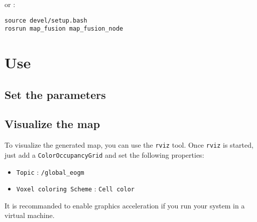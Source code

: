 or :

\begin{verbatim}
source devel/setup.bash
rosrun map_fusion map_fusion_node
\end{verbatim}

\section{Use}

\subsection{Set the parameters}

\todo

\subsection{Visualize the map}

To visualize the generated map, you can use the \texttt{rviz} tool. Once \texttt{rviz} is started, just add a \texttt{ColorOccupancyGrid} and set the following properties:

\begin{itemize}
    \item \texttt{Topic} : \texttt{/global\_eogm}
    \item \texttt{Voxel coloring Scheme} : \texttt{Cell color}
\end{itemize}

It is recommanded to enable graphics acceleration if you run your system in a virtual machine.
